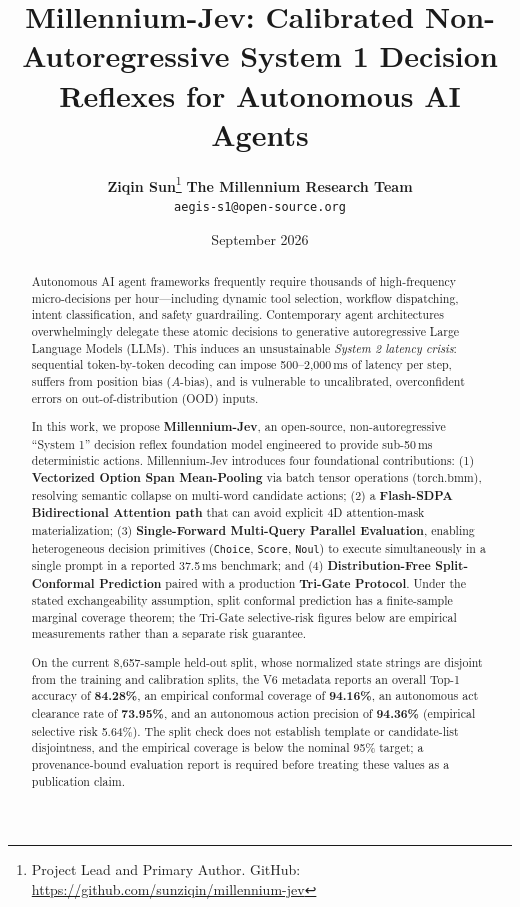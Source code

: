 \documentclass[11pt,a4paper]{article}
\title{\textbf{Millennium-Jev: Calibrated Non-Autoregressive System 1 Decision Reflexes for Autonomous AI Agents}}
\author{
  \textbf{Ziqin Sun}\thanks{Project Lead and Primary Author. GitHub: \url{https://github.com/sunziqin/millennium-jev}} \quad
  \textbf{The Millennium Research Team} \\
  \texttt{aegis-s1@open-source.org}
}
\date{September 2026}
\begin{document}
\maketitle

\begin{abstract}
Autonomous AI agent frameworks frequently require thousands of high-frequency micro-decisions per hour—including dynamic tool selection, workflow dispatching, intent classification, and safety guardrailing. Contemporary agent architectures overwhelmingly delegate these atomic decisions to generative autoregressive Large Language Models (LLMs). This induces an unsustainable \textit{System 2 latency crisis}: sequential token-by-token decoding can impose 500--2,000\,ms of latency per step, suffers from position bias ($A$-bias), and is vulnerable to uncalibrated, overconfident errors on out-of-distribution (OOD) inputs. 

In this work, we propose \textbf{Millennium-Jev}, an open-source, non-autoregressive ``System 1'' decision reflex foundation model engineered to provide sub-50\,ms deterministic actions. Millennium-Jev introduces four foundational contributions: (1) \textbf{Vectorized Option Span Mean-Pooling} via batch tensor operations ($\text{torch.bmm}$), resolving semantic collapse on multi-word candidate actions; (2) a \textbf{Flash-SDPA Bidirectional Attention path} that can avoid explicit 4D attention-mask materialization; (3) \textbf{Single-Forward Multi-Query Parallel Evaluation}, enabling heterogeneous decision primitives (\texttt{Choice}, \texttt{Score}, \texttt{Noul}) to execute simultaneously in a single prompt in a reported 37.5\,ms benchmark; and (4) \textbf{Distribution-Free Split-Conformal Prediction} paired with a production \textbf{Tri-Gate Protocol}. Under the stated exchangeability assumption, split conformal prediction has a finite-sample marginal coverage theorem; the Tri-Gate selective-risk figures below are empirical measurements rather than a separate risk guarantee. 

On the current 8,657-sample held-out split, whose normalized state strings are disjoint from the training and calibration splits, the V6 metadata reports an overall Top-1 accuracy of \textbf{84.28\%}, an empirical conformal coverage of \textbf{94.16\%}, an autonomous act clearance rate of \textbf{73.95\%}, and an autonomous action precision of \textbf{94.36\%} (empirical selective risk 5.64\%). The split check does not establish template or candidate-list disjointness, and the empirical coverage is below the nominal 95\% target; a provenance-bound evaluation report is required before treating these values as a publication claim. 
\end{abstract}
\end{document}
